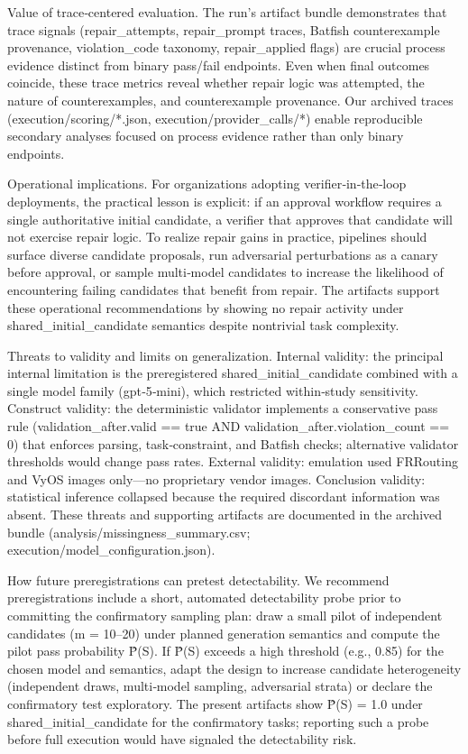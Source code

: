 \documentclass[conference]{IEEEtran}
\begin{document}
Value of trace‑centered evaluation. The run's artifact bundle demonstrates that trace signals (repair\_attempts, repair\_prompt traces, Batfish counterexample provenance, violation\_code taxonomy, repair\_applied flags) are crucial process evidence distinct from binary pass/fail endpoints. Even when final outcomes coincide, these trace metrics reveal whether repair logic was attempted, the nature of counterexamples, and counterexample provenance. Our archived traces (execution/scoring/*.json, execution/provider\_calls/*) enable reproducible secondary analyses focused on process evidence rather than only binary endpoints.

Operational implications. For organizations adopting verifier‑in‑the‑loop deployments, the practical lesson is explicit: if an approval workflow requires a single authoritative initial candidate, a verifier that approves that candidate will not exercise repair logic. To realize repair gains in practice, pipelines should surface diverse candidate proposals, run adversarial perturbations as a canary before approval, or sample multi‑model candidates to increase the likelihood of encountering failing candidates that benefit from repair. The artifacts support these operational recommendations by showing no repair activity under shared\_initial\_candidate semantics despite nontrivial task complexity.

Threats to validity and limits on generalization. Internal validity: the principal internal limitation is the preregistered shared\_initial\_candidate combined with a single model family (gpt‑5‑mini), which restricted within‑study sensitivity. Construct validity: the deterministic validator implements a conservative pass rule (validation\_after.valid == true AND validation\_after.violation\_count == 0) that enforces parsing, task‑constraint, and Batfish checks; alternative validator thresholds would change pass rates. External validity: emulation used FRRouting and VyOS images only---no proprietary vendor images. Conclusion validity: statistical inference collapsed because the required discordant information was absent. These threats and supporting artifacts are documented in the archived bundle (analysis/missingness\_summary.csv; execution/model\_configuration.json).

How future preregistrations can pretest detectability. We recommend preregistrations include a short, automated detectability probe prior to committing the confirmatory sampling plan: draw a small pilot of independent candidates (m = 10--20) under planned generation semantics and compute the pilot pass probability P̂(S). If P̂(S) exceeds a high threshold (e.g., 0.85) for the chosen model and semantics, adapt the design to increase candidate heterogeneity (independent draws, multi‑model sampling, adversarial strata) or declare the confirmatory test exploratory. The present artifacts show P̂(S) = 1.0 under shared\_initial\_candidate for the confirmatory tasks; reporting such a probe before full execution would have signaled the detectability risk.
\end{document}
